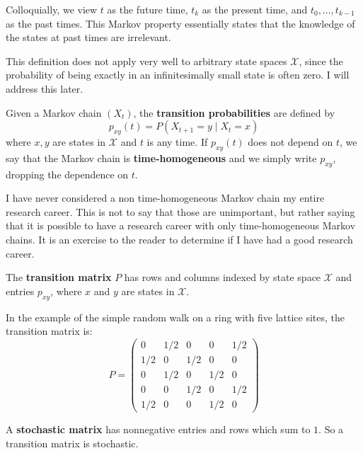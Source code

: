 \documentclass{ximera}
\begin{document}
Colloquially, we view $t$ as the future time, $t_k$ as the present time, and $t_0, \ldots, t_{k-1}$ as the
past times. This Markov property essentially states that the knowledge of the states at past times are
irrelevant.

This definition does not apply very well to arbitrary state spaces $\mathcal{X}$, since the probability of
being exactly in an infinitesimally small state is often zero. I will address this later.

\begin{definition}
Given a Markov chain $(X_t)$, the \textbf{transition probabilities} are defined by
\[
p_{xy}(t) = P(X_{t+1} = y \mid X_t = x)
\]
where $x, y$ are states in $\mathcal{X}$ and $t$ is any time. If $p_{xy}(t)$ does not depend on $t$, we say
that the Markov chain is \textbf{time-homogeneous} and we simply write $p_{xy}$, dropping the dependence
on $t$.
\end{definition}

I have never considered a non time-homogeneous Markov chain my entire research career. This is not to
say that those are unimportant, but rather saying that it is possible to have a research career with only
time-homogeneous Markov chains. It is an exercise to the reader to determine if I have had a good research
career.

\begin{definition}
The \textbf{transition matrix} $P$ has rows and columns indexed by state space $\mathcal{X}$ and entries
$p_{xy}$, where $x$ and $y$ are states in $\mathcal{X}$.
\end{definition}

\begin{example}
In the example of the simple random walk on a ring with five lattice sites, the transition matrix is:
\[
P =
\begin{pmatrix}
0   & 1/2 & 0   & 0   & 1/2 \\
1/2 & 0   & 1/2 & 0   & 0   \\
0   & 1/2 & 0   & 1/2 & 0   \\
0   & 0   & 1/2 & 0   & 1/2 \\
1/2 & 0   & 0   & 1/2 & 0
\end{pmatrix}
\]
\end{example}

\begin{definition}
A \textbf{stochastic matrix} has nonnegative entries and rows which sum to $1$. So a transition matrix is
stochastic.
\end{definition}
\end{document}
